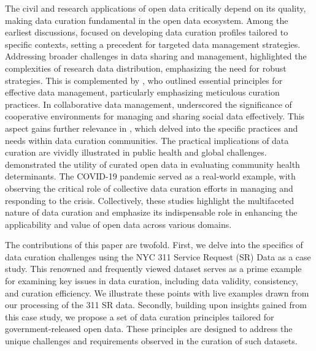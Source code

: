 \documentclass[linenumber]{jdsart}
\begin{document}
The civil and research applications of open data critically depend on
its quality, making data curation fundamental in the open data
ecosystem. Among the earliest discussions,
\citet{witt2009constructing} focused on developing data curation
profiles tailored to specific contexts, setting a precedent for
targeted data management strategies. Addressing broader challenges in
data sharing and management, \citet{borgman2012conundrum} highlighted
the complexities of research data distribution, emphasizing the need
for robust strategies. This is complemented by \citet{hart2016ten},
who outlined essential principles for effective data management,
particularly emphasizing meticulous curation practices. In
collaborative data management, \citet{beheshti2019datasynapse}
underscored the significance of cooperative environments for managing
and sharing social data effectively. This aspect gains further
relevance in \citet{mclure2014data}, which delved into the specific
practices and needs within data curation communities. The practical
implications of data curation are vividly illustrated in public health
and global challenges. \citet{cantor2018facets} demonstrated the
utility of curated open data in evaluating community health
determinants. The COVID-19 pandemic served as a real-world example,
with \citet{shankar2021data} observing the critical role of collective
data curation efforts in managing and responding to the
crisis. Collectively, these studies highlight the multifaceted nature
of data curation and emphasize its indispensable role in enhancing the
applicability and value of open data across various domains.


The contributions of this paper are twofold. First, we delve into
the specifics of data curation challenges using the NYC 311 Service
Request (SR) Data as a case study. This renowned and frequently viewed 
dataset serves as a prime example for examining key issues in data curation, 
including data validity, consistency, and curation efficiency. 
We illustrate these points with live examples drawn from our 
processing of the 311 SR data. Secondly, building upon insights 
gained from this case study, we propose a set of data curation 
principles tailored for government-released open data. These 
principles are designed to address the unique challenges 
and requirements observed in the curation of such datasets.
\end{document}
